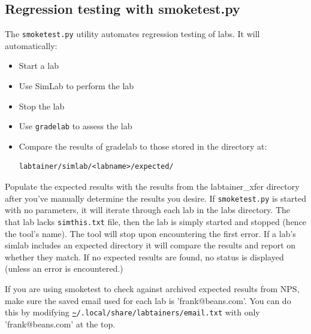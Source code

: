 \documentclass[12pt]{article}
\begin{document}
\subsection{Regression testing with smoketest.py} 
\label{smoketest}
The {\tt smoketest.py} utility automates regression testing of labs.  It will automatically:
\begin{itemize}
\item Start a lab
\item Use SimLab to perform the lab
\item Stop the lab
\item Use {\tt gradelab} to assess the lab
\item Compare the results of gradelab to those stored in the directory at:
\begin{verbatim}
labtainer/simlab/<labname>/expected/
\end{verbatim}
\end{itemize}
\noindent Populate the expected results with the results from the labtainer\_xfer directory after you've
manually determine the results you desire.
If {\tt smoketest.py} is started with no parameters, it will iterate through each lab in the labs
directory.  The that lab lacks {\tt simthis.txt} file, then the lab is simply started and stopped
(hence the tool's name).  The tool will stop upon encountering the first error.
If a lab's simlab includes an expected directory it will compare the results and report on whether they match.
If no expected results are found, no status is displayed (unless an error is encountered.)

If you are using smoketest to check against archived expected results from NPS, make sure the saved email used for each lab is 'frank@beans.com'. You can do this by modifying {\tt \url{~}/.local/share/labtainers/email.txt} with only 'frank@beans.com' at the top. 
\end{document}
